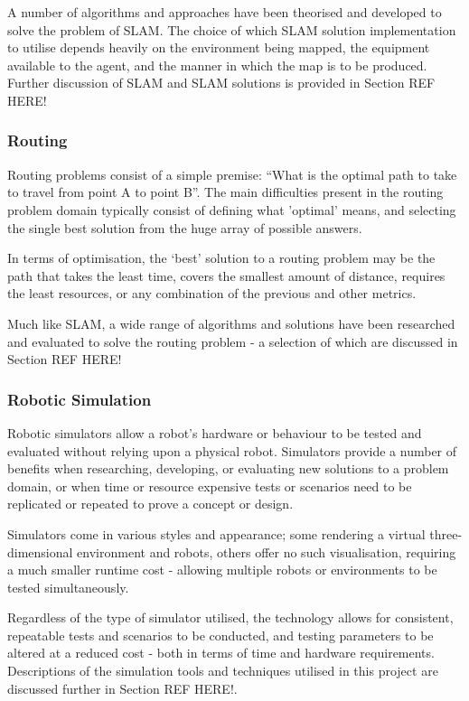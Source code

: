 A number of algorithms and approaches have been theorised and developed to
solve the problem of SLAM.
The choice of which SLAM solution implementation to utilise depends heavily
on the environment being mapped, the equipment available to the agent, and the
manner in which the map is to be produced.
Further discussion of SLAM and SLAM solutions is provided in Section REF HERE!


\subsubsection{Routing}
Routing problems consist of a simple premise: ``What is the optimal path to
take to travel from point A to point B''.
The main difficulties present in the routing problem domain typically consist of
defining what 'optimal' means, and selecting the single best solution from the
huge array of possible answers.

In terms of optimisation, the `best' solution to a routing problem may be the path that takes the
least time, covers the smallest amount of distance, requires the least
resources, or any combination of the previous and other metrics.

Much like SLAM, a wide range of algorithms and solutions have been researched
and evaluated to solve the routing problem - a selection of which are
discussed in Section REF HERE!


\subsubsection{Robotic Simulation}
Robotic simulators allow a robot's hardware or behaviour to be tested and
evaluated without relying upon a physical robot.
Simulators provide a number of benefits when researching, developing, or
evaluating new solutions to a problem domain, or when time or resource
expensive tests or scenarios need to be replicated or repeated to prove a
concept or design.

Simulators come in various styles and appearance; some rendering a virtual
three-dimensional  environment and robots, others offer no such visualisation,
requiring a much smaller runtime cost - allowing multiple robots or
environments to be tested simultaneously.

Regardless of the type of simulator utilised, the technology allows for
consistent, repeatable tests and scenarios to be conducted, and testing
parameters to be altered at a reduced cost - both in terms of time and
hardware requirements.
Descriptions of the simulation tools and techniques utilised in this project
are discussed further in Section REF HERE!.


